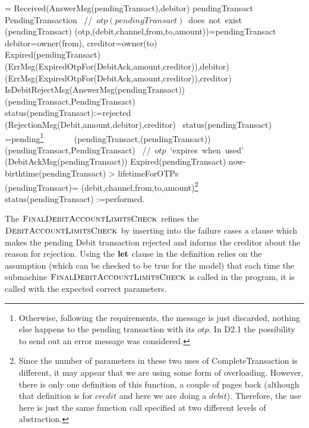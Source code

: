 \begin{asm}
 =\+          
\IF Received(AnswerMsg(pendingTransact),\FROM debitor) \THEN\+
   \IF pendingTransact  \not \in PendingTransaction \mbox{  //  $otp(pendingTransact)$ does not exist} \THEN\+
      (pendingTransact)\-
      \ELSE \+
         \LET (otp,(debit,channel,from,to,amount))=pendingTransact \\
    \LET debitor=owner(from), creditor=owner(to)\\
            \IF Expired(pendingTransact) \THEN \+
     (ErrMsg(ExpiredOtpFor(DebitAck,amount,creditor)),\TO debitor) \\
     (ErrMsg(ExpiredOtpFor(DebitAck,amount,creditor)),\TO creditor)\-
     \ELSE ~\IF  
     IsDebitRejectMsg(AnswerMsg(pendingTransact)) \THEN \+
     (pendingTransact,PendingTransact)\\
     status(pendingTransact):=rejected\\
     (RejectionMsg(Debit,amount,debitor),\TO creditor)\-        
     \ELSE ~\IF status(pendingTransact)   =pending\footnote{Otherwise, following the requirements, the message is just discarded, nothing else happens to the pending transaction with its $otp$. In D2.1 the possibility to send out an error message was considered.} 
     \THEN \+
     \+
     ~~~~~~ (pendingTransact,(pendingTransact))\-
     (pendingTransact,PendingTransact)
     \mbox{  // $otp$ `expires when used'}\dec\dec\- 
     (DebitAckMsg(pendingTransact)) \-
     \WHERE \+
     Expired(pendingTransact) \IFF now-birthtime(pendingTransact) > lifetimeForOTPs\\
     (pendingTransact)=\+
     (debit,channel,from,to,amount)\footnote{Since the number of parameters in these two uses of CompleteTransaction is different, it may appear that we are using some form of overloading. However, there is only one definition of this function, a couple of pages back (although that definition is for $credit$ and here we are doing a $debit$). Therefore, the use here is just the same function call specified at two different levels of abstraction.}\\
     status(pendingTransact) :=performed.
\end{asm}

The $\hbox{\sc FinalDebitAccountLimitsCheck}$ refines the  $\hbox{\sc DebitAccountLimitsCheck}$ by inserting into the failure cases a clause which makes the pending Debit transaction rejected and informs the creditor about the reason for rejection. Using the $\mathrel{\mathbf{let}}$ clause in the definition relies on the assumption (which can be checked to be true for the model) that each time the submachine $\hbox{\sc FinalDebitAccountLimitsCheck}$ is called in the program, it is called with the expected correct parameters.

